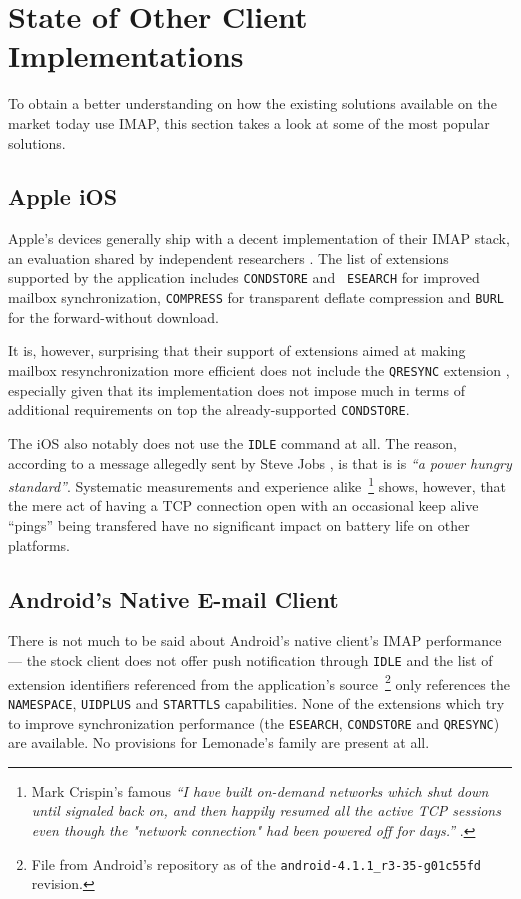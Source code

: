\documentclass[trojita]{subfiles}
\begin{document}
\section{State of Other Client Implementations}

To obtain a better understanding on how the existing solutions available on the market today use IMAP, this section
takes a look at some of the most popular solutions.

\subsection{Apple iOS}

Apple's devices generally ship with a decent implementation of their IMAP stack, an evaluation shared by independent
researchers \cite{isode-iphone4}.  The list of extensions supported by the application includes {\tt CONDSTORE} and {\tt
ESEARCH} for improved mailbox synchronization, {\tt COMPRESS} for transparent deflate compression and {\tt BURL} for the
forward-without download.

It is, however, surprising that their support of extensions aimed at making mailbox resynchronization more efficient
does not include the {\tt QRESYNC} extension \cite{rfc5162}, especially given that its implementation does not impose
much in terms of additional requirements on top the already-supported {\tt CONDSTORE}.

The iOS also notably does not use the {\tt IDLE} command at all.  The reason, according to a message allegedly sent by
Steve Jobs \cite{jobs-ios-idle}, is that is is {\em ``a power hungry standard''}.  Systematic measurements
\cite{wcdma-energy} \cite{cridland-fach-dch-measurements} and experience alike~\footnote{Mark Crispin's famous {\em ``I
have built on-demand networks which shut down until signaled back on, and then happily resumed all the active TCP
sessions even though the "network connection" had been powered off for days.''} \cite{crispin-no-ifup}.} shows, however,
that the mere act of having a TCP connection open with an occasional keep alive ``pings'' being transfered have no
significant impact on battery life on other platforms.

\subsection{Android's Native E-mail Client}

There is not much to be said about Android's native client's IMAP performance --- the stock client does not offer push
notification through {\tt IDLE} \cite{android-idle} and the list of extension identifiers referenced from the
application's source~\footnote{File  from Android's
 repository as of the {\tt android-4.1.1\_r3-35-g01c55fd} revision.} only references
the {\tt NAMESPACE}, {\tt UIDPLUS} and {\tt STARTTLS} capabilities.  None of the extensions which try to improve
synchronization performance (the {\tt ESEARCH}, {\tt CONDSTORE} and {\tt QRESYNC}) are available.  No provisions for
Lemonade's family are present at all.
\end{document}
